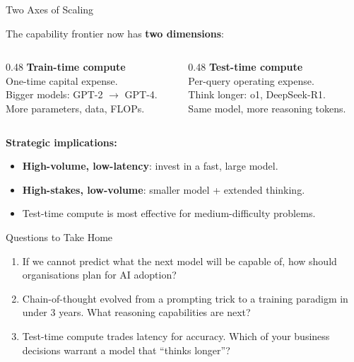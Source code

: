 \documentclass[aspectratio=169, 12pt, xcolor=dvipsnames]{beamer}
\begin{document}
\begin{frame}{Two Axes of Scaling}

{\small The capability frontier now has \textbf{two dimensions}:}

\vspace{0.3em}

\begin{columns}[T]
  \begin{column}{0.48\textwidth}
    \textbf{Train-time compute}\\[0.2em]
    {\small One-time capital expense.\\
    Bigger models: GPT-2 $\to$ GPT-4.\\
    More parameters, data, FLOPs.}
  \end{column}
  \begin{column}{0.48\textwidth}
    \textbf{Test-time compute}\\[0.2em]
    {\small Per-query operating expense.\\
    Think longer: o1, DeepSeek-R1.\\
    Same model, more reasoning tokens.}
  \end{column}
\end{columns}

\vspace{0.5em}

{\small \textbf{Strategic implications:}}
\begin{itemize}\setlength{\itemsep}{0.1em}
  \item {\small \textbf{High-volume, low-latency}: invest in a fast, large model.}
  \item {\small \textbf{High-stakes, low-volume}: smaller model + extended thinking.}
  \item {\small Test-time compute is most effective for \alert{medium-difficulty} problems.}
\end{itemize}

\end{frame}

\begin{frame}{Questions to Take Home}

\begin{enumerate}
  \item[\textbf{1.}] If we cannot predict what the next model will be capable
    of, \alert{how should organisations plan for AI adoption}?

  \vspace{0.8em}
  \item[\textbf{2.}] Chain-of-thought evolved from a prompting trick to a
    training paradigm in under 3 years.
    \alert{What reasoning capabilities are next}?

  \vspace{0.8em}
  \item[\textbf{3.}] Test-time compute trades latency for accuracy.
    \alert{Which of your business decisions warrant a model that ``thinks
    longer''}?
\end{enumerate}

\end{frame}
\end{document}
